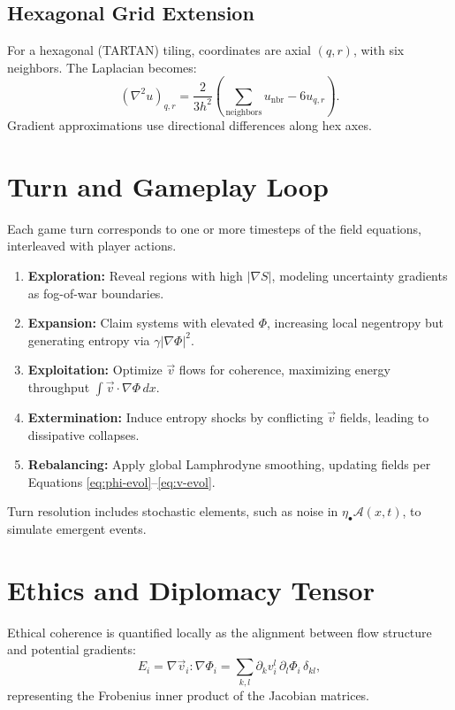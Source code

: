 \documentclass[12pt]{article}
\theoremstyle{definition}
\begin{document}
\subsection{Hexagonal Grid Extension}
For a hexagonal (TARTAN) tiling, coordinates are axial $(q, r)$, with six neighbors. The Laplacian becomes:
\[
(\nabla^2 u)_{q,r} = \frac{2}{3 h^2} \left( \sum_{\text{neighbors}} u_{\text{nbr}} - 6 u_{q,r} \right).
\]
Gradient approximations use directional differences along hex axes.

\section{Turn and Gameplay Loop}
Each game turn corresponds to one or more timesteps of the field equations, interleaved with player actions.

\begin{enumerate}
  \item \textbf{Exploration:} Reveal regions with high $|\nabla S|$, modeling uncertainty gradients as fog-of-war boundaries.
  \item \textbf{Expansion:} Claim systems with elevated $\Phi$, increasing local negentropy but generating entropy via $\gamma |\nabla \Phi|^2$.
  \item \textbf{Exploitation:} Optimize $\vec{v}$ flows for coherence, maximizing energy throughput $\int \vec{v} \cdot \nabla \Phi \, dx$.
  \item \textbf{Extermination:} Induce entropy shocks by conflicting $\vec{v}$ fields, leading to dissipative collapses.
  \item \textbf{Rebalancing:} Apply global Lamphrodyne smoothing, updating fields per Equations \eqref{eq:phi-evol}--\eqref{eq:v-evol}.
\end{enumerate}

Turn resolution includes stochastic elements, such as noise in $\eta_\bullet \mathcal{A}(x,t)$, to simulate emergent events.

\section{Ethics and Diplomacy Tensor}
Ethical coherence is quantified locally as the alignment between flow structure and potential gradients:
\[
E_i = \nabla \vec{v}_i : \nabla \Phi_i = \sum_{k,l} \partial_k v^l_i \, \partial_l \Phi_i \, \delta_{kl},
\]
representing the Frobenius inner product of the Jacobian matrices.
\end{document}
